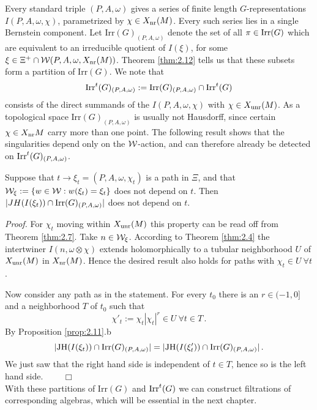 Every standard triple $(P,A,\omega )$ gives a series of finite length $G$-representations 
$I(P,A,\omega ,\chi )$, parametrized by $\chi \in X_{\mathrm{nr}} (M)$. Every such series lies in a 
single Bernstein component. Let Irr$(G)_{(P,A,\omega )}$ denote the set of all 
$\pi \in \mathrm{Irr}(G)$ which are equivalent to an irreducible quotient of $I(\xi )$, for some 
$\xi \in \Xi^+ \cap \mathcal W (P,A,\omega, X_{\mathrm{nr}} (M) )$. Theorem \ref{thm:2.12} tells us that 
these subsets form a partition of Irr$(G)$. We note that
\[
\mathrm{Irr}^t (G)_{(P,A,\omega )} := \mathrm{Irr}(G)_{(P,A,\omega )} \cap \mathrm{Irr}^t (G)
\]
consists of the direct summands of the $I(P,A,\omega ,\chi )$ with $\chi \in X_{\mathrm{unr}} (M)$.
As a topological space Irr$(G)_{(P,A,\omega )}$ is usually not Hausdorff, since certain
$\chi \in X_{\mathrm{nr}} {M}$ carry more than one point. The following result shows that the 
singularities depend only on the $\mathcal W$-action, and can therefore already be detected on 
$\mathrm{Irr}^t (G)_{(P,A,\omega )}$.

\begin{lem}\label{lem:2.16}
Suppose that $t \to \xi_t = (P,A,\omega ,\chi_t )$ is a path in $\Xi$, and that 
$\mathcal W_\xi := \{ w \in \mathcal W : w (\xi_t ) = \xi_t \}$ does not depend on $t$. Then
$| JH (I(\xi_t )) \cap \mathrm{Irr}(G )_{(P,A,\omega )} |$ does not depend on $t$.
\end{lem}
\emph{Proof.}
For $\chi_t$ moving within $X_{\mathrm{unr}} (M)$ this property can be read 
off from Theorem \ref{thm:2.7}. Take $n \in \mathcal W_{\xi}$. According  to 
Theorem \ref{thm:2.4} the intertwiner $I(n, \omega \otimes \chi )$ extends
holomorphically to a tubular neighborhood $U$ of $X_{\mathrm{unr}} (M)$ in $X_{\mathrm{nr}} (M)$.
Hence the desired result also holds for paths with $\chi_t \in U \: \forall t$.

Now consider any path as in the statement. For every $t_0$ there is an 
$r \in (-1,0]$ and a neighborhood $T$ of $t_0$ such that 
\[
\chi'_t := \chi_t |\chi_t |^r \in U \: \forall t \in T \,.
\]
By Proposition \ref{prop:2.11}.b
\[
| \mathrm{JH} (I(\xi_t )) \cap \mathrm{Irr}(G )_{(P,A,\omega )} | = 
| \mathrm{JH} (I(\xi'_t )) \cap \mathrm{Irr}(G )_{(P,A,\omega )} | \,.
\]
We just saw that the right hand side is independent of $t \in T$, hence so is the 
left hand side. $\qquad \Box$ 
\\[2mm]

With these partitions of Irr$ (G)$ and $\mathrm{Irr}^t (G)$ we can construct filtrations of
corresponding algebras, which will be essential in the next chapter.

